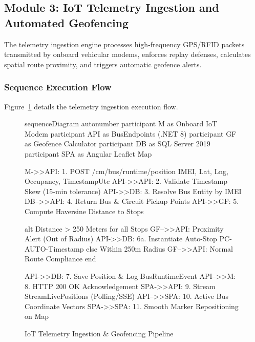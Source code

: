 \subsection{Module 3: IoT Telemetry Ingestion and Automated Geofencing}
\label{sec:impl_telemetry_geofence}

The telemetry ingestion engine processes high-frequency GPS/RFID packets transmitted by onboard vehicular modems, enforces replay defenses, calculates spatial route proximity, and triggers automatic geofence alerts.

\subsubsection{Sequence Execution Flow}
Figure~\ref{fig:seq_telemetry} details the telemetry ingestion execution flow.

\begin{figure}[H]
  \centering
  \begin{mermaid}[width=0.95\textwidth]
sequenceDiagram
    autonumber
    participant M as Onboard IoT Modem
    participant API as BusEndpoints (.NET 8)
    participant GF as Geofence Calculator
    participant DB as SQL Server 2019
    participant SPA as Angular Leaflet Map
    
    M->>API: 1. POST /cm/bus/runtime/position {IMEI, Lat, Lng, Occupancy, TimestampUtc}
    API->>API: 2. Validate Timestamp Skew (15-min tolerance)
    API->>DB: 3. Resolve Bus Entity by IMEI
    DB-->>API: 4. Return Bus & Circuit Pickup Points
    API->>GF: 5. Compute Haversine Distance to Stops
    
    alt Distance > 250 Meters for all Stops
        GF-->>API: Proximity Alert (Out of Radius)
        API->>DB: 6a. Instantiate Auto-Stop PC-AUTO-{Timestamp}
    else Within 250m Radius
        GF-->>API: Normal Route Compliance
    end
    
    API->>DB: 7. Save Position & Log BusRuntimeEvent
    API-->>M: 8. HTTP 200 OK Acknowledgement
    SPA->>API: 9. Stream StreamLivePositions (Polling/SSE)
    API-->>SPA: 10. Active Bus Coordinate Vectors
    SPA->>SPA: 11. Smooth Marker Repositioning on Map
  \end{mermaid}
  \caption{IoT Telemetry Ingestion \& Geofencing Pipeline}
  \label{fig:seq_telemetry}
\end{figure}

